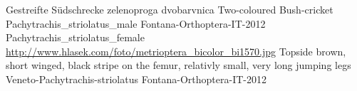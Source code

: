{Gestreifte S\"{u}dschrecke} %
{zelenoproga dvobarvnica} %
{Two-coloured Bush-cricket} %
{Pachytrachis_striolatus_male} %
{Fontana-Orthoptera-IT-2012}%
{Pachytrachis_striolatus_female} %
{\url{http://www.hlasek.com/foto/metrioptera_bicolor_bi1570.jpg}} %
{Topside brown, short winged, black stripe on the femur, relativly small, very long jumping legs} %
{} %
{Veneto-Pachytrachis-striolatus} %
{Fontana-Orthoptera-IT-2012}%
